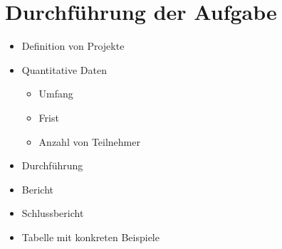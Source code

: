 \section{Durchführung der Aufgabe}

\begin{itemize}
    \item Definition von Projekte
    \item Quantitative Daten
    \begin{itemize}
        \item Umfang
        \item Frist
        \item Anzahl von Teilnehmer
    \end{itemize}
    \item Durchführung
    \item Bericht
    \item Schlussbericht
    \item Tabelle mit konkreten Beispiele
\end{itemize}